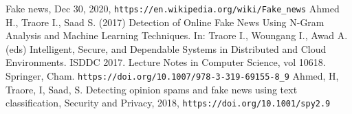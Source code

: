 \documentclass[a4paper,12pt,nottoc]{article}
\begin{document}
%
\begin{thebibliography}{9}
 Fake news, Dec 30, 2020, \texttt{https://en.wikipedia.org/wiki/Fake\_news}
 Ahmed H., Traore I., Saad S. (2017) Detection of Online Fake News Using N-Gram Analysis and Machine Learning Techniques. In: Traore I., Woungang I., Awad A. (eds) Intelligent, Secure, and Dependable Systems in Distributed and Cloud Environments. ISDDC 2017. Lecture Notes in Computer Science, vol 10618. Springer, Cham. \texttt{https://doi.org/10.1007/978-3-319-69155-8\_9}
 Ahmed, H, Traore, I, Saad, S. Detecting opinion spams and fake news using text classification, Security and Privacy, 2018, \texttt{https://doi.org/10.1001/spy2.9}
\end{thebibliography}
\end{document}

